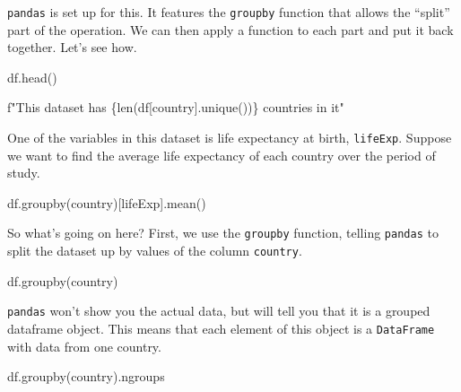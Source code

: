 \documentclass[
  letterpaper,
]{scrbook}
\newenvironment{Shaded}{\begin{snugshade}}{\end{snugshade}}
\newcommand{\BuiltInTok}[1]{#1}
\newcommand{\NormalTok}[1]{#1}
\newcommand{\SpecialCharTok}[1]{\textcolor[rgb]{0.00,0.00,0.00}{#1}}
\newcommand{\SpecialStringTok}[1]{\textcolor[rgb]{0.31,0.60,0.02}{#1}}
\newcommand{\StringTok}[1]{\textcolor[rgb]{0.31,0.60,0.02}{#1}}
\begin{document}
\texttt{pandas} is set up for this. It features the \texttt{groupby} function that allows the ``split'' part of the operation. We can then apply a function to each part and put it back together. Let's see how.

\begin{Shaded}
\begin{Highlighting}[]
\NormalTok{df.head()}
\end{Highlighting}
\end{Shaded}

\begin{Shaded}
\begin{Highlighting}[]
\SpecialStringTok{f"This dataset has }\SpecialCharTok{\{}\BuiltInTok{len}\NormalTok{(df[}\StringTok{\textquotesingle{}country\textquotesingle{}}\NormalTok{].unique())}\SpecialCharTok{\}}\SpecialStringTok{ countries in it"}
\end{Highlighting}
\end{Shaded}

One of the variables in this dataset is life expectancy at birth, \texttt{lifeExp}. Suppose we want to find the average life expectancy of each country over the period of study.

\begin{Shaded}
\begin{Highlighting}[]
\NormalTok{df.groupby(}\StringTok{\textquotesingle{}country\textquotesingle{}}\NormalTok{)[}\StringTok{\textquotesingle{}lifeExp\textquotesingle{}}\NormalTok{].mean()}
\end{Highlighting}
\end{Shaded}

So what's going on here? First, we use the \texttt{groupby} function, telling \texttt{pandas} to split the dataset up by values of the column \texttt{country}.

\begin{Shaded}
\begin{Highlighting}[]
\NormalTok{df.groupby(}\StringTok{\textquotesingle{}country\textquotesingle{}}\NormalTok{)}
\end{Highlighting}
\end{Shaded}

\texttt{pandas} won't show you the actual data, but will tell you that it is a grouped dataframe object. This means that each element of this object is a \texttt{DataFrame} with data from one country.

\begin{Shaded}
\begin{Highlighting}[]
\NormalTok{df.groupby(}\StringTok{\textquotesingle{}country\textquotesingle{}}\NormalTok{).ngroups}
\end{Highlighting}
\end{Shaded}
\end{document}
